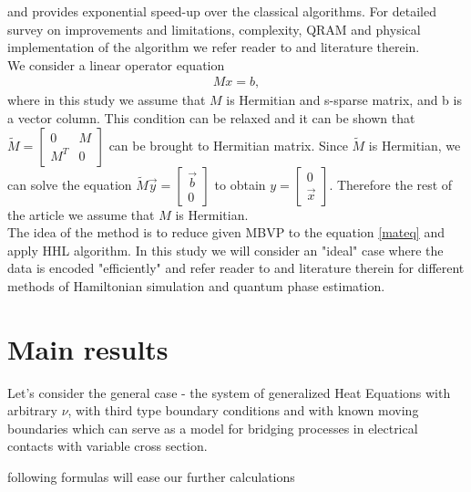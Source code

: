 \documentclass[review]{elsarticle}
\begin{document}
and provides exponential speed-up over the classical algorithms. For detailed survey on improvements and limitations, complexity, QRAM and physical implementation  of the algorithm we refer reader to \cite{duan20physleta, Dervovic2018QuantumLS} and literature therein.\\
We consider a linear operator equation
\begin{align}
Mx = b,
\label{mateq}
\end{align}
where in this study we assume that $M$ is Hermitian and s-sparse matrix, and b is a vector column. This condition can be relaxed and it can be shown that $\tilde{M} = \begin{bmatrix}
0 & M\\
M^{T} & 0
\end{bmatrix}$ can be brought to Hermitian matrix.
Since $\tilde{M}$ is Hermitian, we can solve the equation 
$\tilde{M}\vec{y} = \begin{bmatrix}
\vec{b}\\
0
\end{bmatrix}$
to obtain $y = \begin{bmatrix}
0\\
\vec{x}
\end{bmatrix}$.
Therefore the rest of the article we assume that $M$ is Hermitian.\\
The idea of the method is to reduce given MBVP to the equation \ref{mateq} and apply HHL algorithm.
In this study we will consider an "ideal" case where the data is encoded "efficiently" and refer reader to \cite{Dervovic2018QuantumLS} and literature therein for different methods of Hamiltonian simulation and quantum phase estimation.
\section{Main results}
\label{sec:main}
Let's consider the general case - the system of generalized Heat Equations with  arbitrary $\nu$, with third type boundary conditions and with known moving boundaries which can serve as a model for bridging processes in electrical contacts with variable cross section.

following formulas will ease our further calculations 
\end{document}

